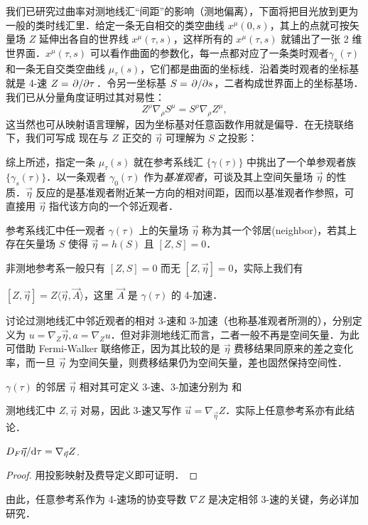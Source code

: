 我们已研究过曲率对测地线汇“间距”的影响（测地偏离），下面将把目光放到更为一般的类时线汇里．给定一条无自相交的类空曲线 $x^\mu(0,s)$，其上的点就可按矢量场 $Z$ 延伸出各自的世界线 $x^\mu(\tau,s)$，这样所有的 $x^\mu(\tau,s)$ 就铺出了一张 2 维世界面．$x^\mu(\tau,s)$ 可以看作曲面的参数化，每一点都对应了一条类时观者$\gamma_s(\tau)$和一条无自交类空曲线 $\mu_\tau(s)$，它们都是曲面的坐标线．沿着类时观者的坐标基就是 4-速 $Z=\pdv*{\tau}$．令另一坐标基 $S=\pdv*{s}$，二者构成世界面上的坐标基场．我们已从分量角度证明过其对易性：
\[
Z^\rho\nabla_\rho S^\mu=S^\rho\nabla_\rho Z^\mu,
\]
这当然也可从映射语言理解，因为坐标基对任意函数作用就是偏导．在无挠联络下，我们可写成
现在与 $Z$ 正交的 $\vec\eta$ 可理解为 $S$ 之投影：

综上所述，指定一条 $\mu_\tau(s)$ 就在参考系线汇 $\{\gamma(\tau)\}$ 中挑出了一个单参观者族 $\{\gamma_s(\tau)\}$．以一条观者 $\gamma_0(\tau)$ 作为\textit{基准观者}，可谈及其上空间矢量场 $\vec\eta$ 的性质．$\vec\eta$ 反应的是基准观者附近某一方向的相对间距，因而以基准观者作参照，可直接用 $\vec\eta$ 指代该方向的一个邻近观者．
\begin{definition}[邻居]
    参考系线汇中任一观者 $\gamma(\tau)$ 上的矢量场 $\vec\eta$ 称为其一个邻居(neighbor)，若其上存在矢量场 $S$ 使得 $\vec\eta=h(S)$ 且 $[Z,S]=0$．
\end{definition}
非测地参考系一般只有 $[Z,S]=0$ 而无 $[Z,\vec\eta]=0$，实际上我们有
\begin{theorem}
    $[Z,\vec\eta]=Z\langle\vec\eta,\vec A\rangle$，这里 $\vec A$ 是 $\gamma(\tau)$ 的 4-加速．
\end{theorem}

讨论过测地线汇中邻近观者的相对 3-速和 3-加速（也称基准观者所测的），分别定义为 $u=\nabla_Z\vec\eta,a=\nabla_Zu$．但对非测地线汇而言，二者一般不再是空间矢量．为此可借助 Fermi-Walker 联络修正，因为其比较的是 $\vec\eta$ 费移结果同原来的差之变化率，而一旦 $\vec\eta$ 为空间矢量，则费移结果仍为空间矢量，差也固然保持空间性．
\begin{definition}[相邻 3-速、3-加速]
    $\gamma(\tau)$ 的邻居 $\vec\eta$ 相对其可定义 3-速、3-加速分别为
    和
\end{definition}
测地线汇中 $Z,\vec\eta$ 对易，因此 3-速又写作 $\vec u=\nabla_{\vec\eta} Z$．实际上任意参考系亦有此结论．
\begin{theorem}
    ${D_F\vec\eta}/{\dd\tau}=\nabla_{\vec\eta} Z$.
\end{theorem}
\begin{proof}
    用投影映射及费导定义即可证明．
\end{proof}
由此，任意参考系作为 4-速场的协变导数 $\nabla Z$ 是决定相邻 3-速的关键，务必详加研究．

